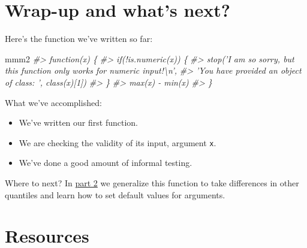\documentclass[
]{book}
\newenvironment{Shaded}{\begin{snugshade}}{\end{snugshade}}
\newcommand{\CommentTok}[1]{\textcolor[rgb]{0.56,0.35,0.01}{\textit{#1}}}
\newcommand{\NormalTok}[1]{#1}
\providecommand{\tightlist}{%
  \setlength{\itemsep}{0pt}\setlength{\parskip}{0pt}}
\begin{document}
\hypertarget{wrap-up-and-whats-next}{%
\section{Wrap-up and what's next?}\label{wrap-up-and-whats-next}}

Here's the function we've written so far:

\begin{Shaded}
\begin{Highlighting}[]
\NormalTok{mmm2}
\CommentTok{#> function(x) \{}
\CommentTok{#>   if(!is.numeric(x)) \{}
\CommentTok{#>     stop('I am so sorry, but this function only works for numeric input!\textbackslash{}n',}
\CommentTok{#>          'You have provided an object of class: ', class(x)[1])}
\CommentTok{#>   \}}
\CommentTok{#>   max(x) - min(x)}
\CommentTok{#> \}}
\end{Highlighting}
\end{Shaded}

What we've accomplished:

\begin{itemize}
\tightlist
\item
  We've written our first function.
\item
  We are checking the validity of its input, argument \texttt{x}.
\item
  We've done a good amount of informal testing.
\end{itemize}

Where to next? In \protect\hyperlink{functions-part2}{part 2} we generalize this function to take differences in other quantiles and learn how to set default values for arguments.

\hypertarget{resources}{%
\section{Resources}\label{resources}}
\end{document}
